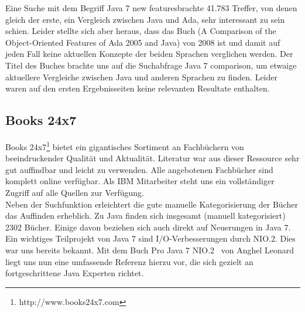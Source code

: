 Eine Suche mit dem Begriff \glqq Java 7 new features\grqq brachte 41.783 Treffer, von denen gleich der erste, ein Vergleich zwischen
Java und Ada, sehr interessant zu sein schien. Leider stellte sich aber heraus, dass das Buch 
(\glqq A Comparison of the Object-Oriented Features of Ada 2005 and Java\grqq\cite{adacomparison}) von 2008 ist 
und damit auf jeden Fall keine aktuellen Konzepte der beiden Sprachen verglichen werden.
Der Titel des Buches brachte uns auf die Suchabfrage \glqq Java 7 comparison\grqq, um etwaige aktuellere Vergleiche zwischen
Java und anderen Sprachen zu finden. Leider waren auf den ersten Ergebnisseiten keine relevanten
Resultate enthalten.

%

\subsection{Books 24x7}
Books 24x7\footnote{http://www.books24x7.com} bietet ein gigantisches Sortiment an Fachbüchern von beeindruckender Qualität und Aktualität. Literatur war aus dieser Ressource sehr gut auffindbar und leicht zu verwenden. Alle angebotenen Fachbücher sind komplett online verfügbar. Als IBM Mitarbeiter steht uns ein vollständiger Zugriff auf alle Quellen zur Verfügung.\\

Neben der Suchfunktion erleichtert die gute manuelle Kategorisierung der Bücher das Auffinden erheblich. Zu Java finden sich insgesamt (manuell kategorisiert) 2302 Bücher. Einige davon beziehen sich auch direkt auf Neuerungen in Java 7.\\

Ein wichtiges Teilprojekt von Java 7 sind I/O-Verbesserungen durch NIO.2. Dies war uns bereits bekannt. Mit dem Buch \glqq Pro Java 7 NIO.2\grqq\cite{b247nio2} ~von Anghel Leonard liegt uns nun eine umfassende Referenz hierzu vor, die sich gezielt an fortgeschrittene Java Experten richtet.

